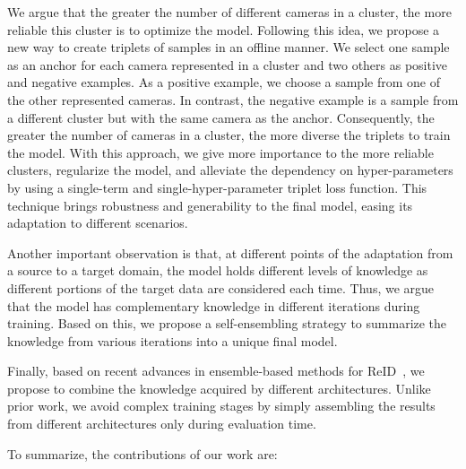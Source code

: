 \documentclass[journal]{IEEEtran}
\begin{document}
We argue that the greater the number of different cameras in a cluster, the more reliable this cluster is to optimize the model. Following this idea, we propose a new way to create triplets of samples in an offline manner. We select one sample as an anchor for each camera represented in a cluster and two others as positive and negative examples. As a positive example, we choose a sample from one of the other represented cameras. In contrast, the negative example is a sample from a different cluster but with the same camera as the anchor. Consequently, the greater the number of cameras in a cluster, the more diverse the triplets to train the model. With this approach, we give more importance to the more reliable clusters, regularize the model, and alleviate the dependency on hyper-parameters by using a single-term and single-hyper-parameter triplet loss function. This technique brings robustness and generability to the final model, easing its adaptation to different scenarios. \par  

Another important observation is that, at different points of the adaptation from a source to a target domain, the model holds different levels of knowledge as different portions of the target data are considered each time. Thus, we argue that the model has complementary knowledge in different iterations during training. Based on this, we propose a self-ensembling strategy to summarize the knowledge from various iterations into a unique final model.

Finally, based on recent advances in ensemble-based methods for ReID~\cite{ge2020mutual, zhai2020multiple}, we propose to combine the knowledge acquired by different architectures. Unlike prior work, we avoid complex training stages by simply assembling the results from different architectures only during evaluation time. \par 

To summarize, the contributions of our work are:
\end{document}
